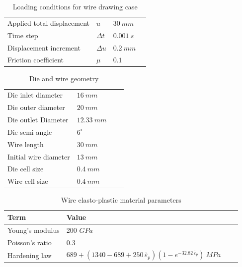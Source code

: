 \documentclass[sn-mathphys,Numbered,draft]{sn-jnl}%
\begin{document}
\begin{table}[htb]
	\centering
		\begin{tabular}{llll} \hline
		    Applied total displacement & $u$ & $30\ mm$ \\
		    Time step & $\Delta t$ & $0.001\ s$ \\
			Displacement increment  & $\Delta u$ & $0.2\ mm$   \\
			Friction coefficient & $\mu$ & $0.1$ \\
			\hline
		\end{tabular}
	\caption{Loading conditions for wire drawing case}
	\label{tab:material_properties}
\end{table}

\begin{table}[htb]
	\centering
		\begin{tabular}{llll} \hline
		    Die inlet diameter & $16\ mm$ \\
		    Die outer diameter & $20\ mm$ \\
      	Die outlet Diameter & $12.33\ mm$ \\
            Die semi-angle &  $6^{\circ}$ \\
		    Wire length & $30\ mm$ \\
		    Initial wire diameter & $13\ mm$ \\
      	Die cell size & $0.4\ mm$ \\
            Wire cell size & $0.4\ mm$ \\
			\hline
		\end{tabular}
	\caption{Die and wire geometry}
	\label{tab:material_properties}
\end{table}


\begin{table}[htb]
	\centering
		\begin{tabular}{llll} \hline
			Term  & Value  \\ \hline 
            Young's modulus & 200 $GPa$ \\
			Poisson's ratio & 0.3  \\
   		Hardening law & $689+(1340-689+250\,\bar{\varepsilon}_p)(1-e^{-32.82\,\bar{\varepsilon}_p})\ MPa$ &  \\
			\hline
		\end{tabular}
	\caption{Wire elasto-plastic material parameters}
	\label{tab:material_properties}
\end{table}
\end{document}
